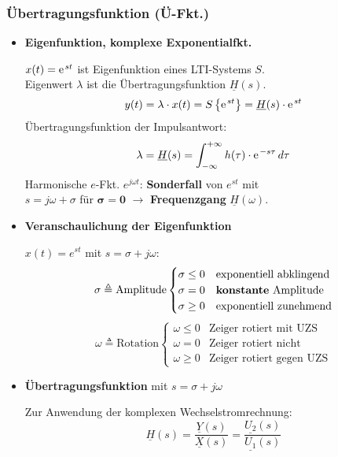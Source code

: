   \subsubsection{Übertragungsfunktion (Ü-Fkt.)}\label{ufkt}
  \begin{itemize}[leftmargin=*]      
      \item{\textbf{Eigenfunktion, komplexe Exponentialfkt.}}
      
    $x(t)= \e^{st}$ ist Eigenfunktion eines LTI-Systems $S$.\\
    Eigenwert $\lambda$ ist die Übertragungsfunktion $\underline{H}(s)$.
          \[
          y(t) = \lambda \cdot x(t) = S\left\{ \e^{st} \right\} = \underline{H}(s)\cdot \e^{st}
          \]
      	Übertragungsfunktion der Impulsantwort:
          \[
          \lambda = \underline{H}(s) = \int_{-\infty}^{+\infty} h(\tau) \cdot  \e^{-s\tau} \, d\tau
          \]
        	Harmonische $e$-Fkt. $e^{j\omega t}$:
          \textbf{Sonderfall} von $e^{st}$ mit\\ $s=j\omega+\sigma$ für $\mathbf{\sigma=0}$ $\rightarrow$ \textbf{Frequenzgang} $\underline{H}(\omega)$.
          
      \item{\textbf{Veranschaulichung der Eigenfunktion}}
      
      $x(t)=e^{st}$ mit $s=\sigma + j\omega $:
          \small
          \[
              \sigma \triangleq \text{Amplitude}
              \begin{cases}
                  \sigma \leq 0 & \text{exponentiell abklingend}\\
                  \sigma = 0 & \text{\textbf{konstante} Amplitude}\\
                  \sigma \geq 0 & \text{exponentiell zunehmend}
              \end{cases}
          \]
          \[
              \omega \triangleq \text{Rotation}
              \begin{cases}
                  \omega \leq 0 & \text{Zeiger rotiert mit UZS}\\
                  \omega = 0 & \text{Zeiger rotiert nicht}\\
                  \omega \geq 0 & \text{Zeiger rotiert gegen UZS}
              \end{cases}
          \]
          \normalsize
  
\item \textbf{\"Ubertragungsfunktion}
  mit $s=\sigma+j\omega$
  
\small Zur Anwendung der komplexen Wechselstromrechnung:
  \[
      \underline{H}(s)=\frac{\underline{Y}(s)}{\underline{X}(s)}=\frac{\underline{U_2}(s)}{\underline{U_1}(s)}
  \]
\normalsize
\end{itemize}

